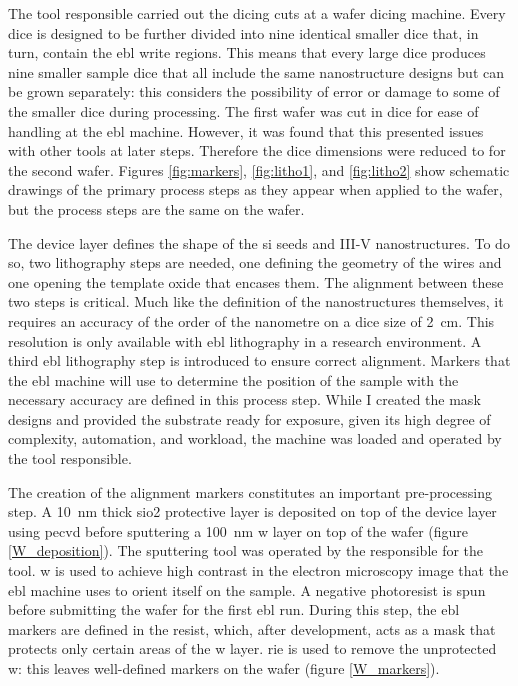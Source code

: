 The tool responsible carried out the dicing cuts at a wafer dicing machine. Every dice is designed to be further divided into nine identical  smaller dice that, in turn, contain the \acs{ebl} write regions. This means that every large dice produces nine smaller sample dice that all include the same nanostructure designs but can be grown separately: this considers the possibility of error or damage to some of the smaller dice during processing. The first wafer was cut in  dice for ease of handling at the \acs{ebl} machine. However, it was found that this presented issues with other tools at later steps. Therefore the dice dimensions were reduced to  for the second wafer. Figures \ref{fig:markers}, \ref{fig:litho1}, and \ref{fig:litho2} show schematic drawings of the primary process steps as they appear when applied to the  wafer, but the process steps are the same on the  wafer.
 \par 
The device layer defines the shape of the \acl{si} seeds and III-V nanostructures. To do so, two lithography steps are needed, one defining the geometry of the wires and one opening the template oxide that encases them. The alignment between these two steps is critical. Much like the definition of the nanostructures themselves, it requires an accuracy of the order of the nanometre on a dice size of \qty{2}{cm}. This resolution is only available with \acf{ebl} lithography in a research environment. A third \acs{ebl} lithography step is introduced to ensure correct alignment. Markers that the \acs{ebl} machine will use to determine the position of the sample with the necessary accuracy are defined in this process step. While I created the mask designs and provided the substrate ready for exposure, given its high degree of complexity, automation, and workload, the machine was loaded and operated by the tool responsible.
\par
The creation of the alignment markers constitutes an important pre-processing step. A \qty{10}{nm} thick \acs{sio2} protective layer is deposited on top of the device layer using \acf{pecvd} before sputtering a \qty{100}{\nm} \acf{w} layer on top of the wafer (figure \ref{W_deposition}). The sputtering tool was operated by the responsible for the tool. \Acl{w} is used to achieve high contrast in the electron microscopy image that the \acs{ebl} machine uses to orient itself on the sample. A negative photoresist is spun before submitting the wafer for the first \acs{ebl} run. During this step, the \acs{ebl} markers are defined in the resist, which, after development, acts as a mask that protects only certain areas of the \acl{w} layer. \Acf{rie} is used to remove the unprotected \acl{w}: this leaves well-defined markers on the wafer (figure \ref{W_markers}).  

